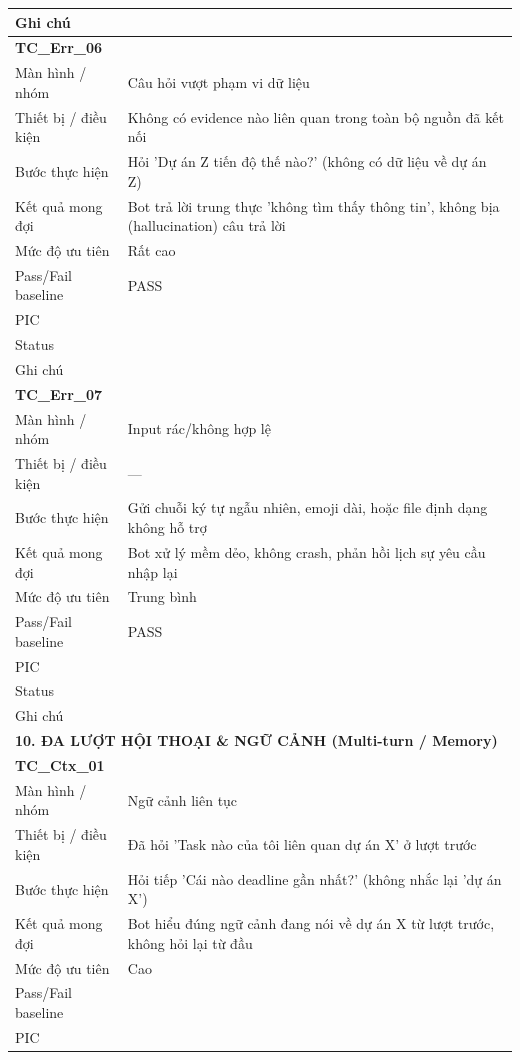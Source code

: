 \documentclass[12pt,a4paper]{article}
\begin{document}
\begin{longtable}{p{3.0cm}p{11.5cm}}
Ghi chú &  \\
\midrule
\multicolumn{2}{l}{\textbf{TC\_Err\_06}} \\
Màn hình / nhóm & Câu hỏi vượt phạm vi dữ liệu \\
Thiết bị / điều kiện & Không có evidence nào liên quan trong toàn bộ nguồn đã kết nối \\
Bước thực hiện & Hỏi 'Dự án Z tiến độ thế nào?' (không có dữ liệu về dự án Z) \\
Kết quả mong đợi & Bot trả lời trung thực 'không tìm thấy thông tin', không bịa (hallucination) câu trả lời \\
Mức độ ưu tiên & Rất cao \\
Pass/Fail baseline & PASS \\
PIC &  \\
Status &  \\
Ghi chú &  \\
\midrule
\multicolumn{2}{l}{\textbf{TC\_Err\_07}} \\
Màn hình / nhóm & Input rác/không hợp lệ \\
Thiết bị / điều kiện & — \\
Bước thực hiện & Gửi chuỗi ký tự ngẫu nhiên, emoji dài, hoặc file định dạng không hỗ trợ \\
Kết quả mong đợi & Bot xử lý mềm dẻo, không crash, phản hồi lịch sự yêu cầu nhập lại \\
Mức độ ưu tiên & Trung bình \\
Pass/Fail baseline & PASS \\
PIC &  \\
Status &  \\
Ghi chú &  \\
\midrule
\multicolumn{2}{l}{\textbf{10. ĐA LƯỢT HỘI THOẠI \& NGỮ CẢNH (Multi-turn / Memory)}} \\ \midrule
\multicolumn{2}{l}{\textbf{TC\_Ctx\_01}} \\
Màn hình / nhóm & Ngữ cảnh liên tục \\
Thiết bị / điều kiện & Đã hỏi 'Task nào của tôi liên quan dự án X' ở lượt trước \\
Bước thực hiện & Hỏi tiếp 'Cái nào deadline gần nhất?' (không nhắc lại 'dự án X') \\
Kết quả mong đợi & Bot hiểu đúng ngữ cảnh đang nói về dự án X từ lượt trước, không hỏi lại từ đầu \\
Mức độ ưu tiên & Cao \\
Pass/Fail baseline &  \\
PIC &  \\

\end{longtable}
\end{document}
